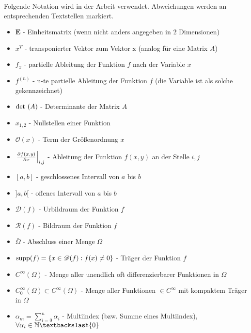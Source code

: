 Folgende Notation wird in der Arbeit verwendet. Abweichungen werden an entsprechenden Textstellen markiert.

\begin{itemize}[label={}]
    \item $\boldsymbol{E}$ - Einheitsmatrix (wenn nicht anders angegeben in 2 Dimensionen) \\
    \item $x^T$ - transponierter Vektor zum Vektor x (analog für eine Matrix $A$) \\
    \item $f_x$ - partielle Ableitung der Funktion $f$ nach der Variable $x$ \\
    \item $f^{(n)}$ - n-te partielle Ableitung der Funktion $f$ (die Variable ist als solche gekennzeichnet) \\
    \item $\text{det}\,\left(A\right)$ - Determinante der Matrix $A$ \\
    \item $x_{1,2}$ - Nullstellen einer Funktion \\
    \item $\mathcal{O}(x)$ - Term der Größenordnung $x$ \\
    \item $\left.\frac{\partial f(x,y)}{\partial x}\right\vert_{i,j}$ - Ableitung der Funktion $f(x,y)$ an der Stelle $i,j$ \\
    \item $[a,b]$ - geschlossenes Intervall von $a$ bis $b$ \\
    \item $]a,b[$ - offenes Intervall von $a$ bis $b$ \\
    \item $\mathscr{D}(f)$ - Urbildraum der Funktion $f$ \\
    \item $\mathscr{R}(f)$ - Bildraum der Funktion $f$ \\
    \item $\bar{\Omega}$ - Abschluss einer Menge $\Omega$ \\
    \item $\text{supp} (f)=\left\{ x\in \mathscr{D}(f) : f(x) \neq 0 \right\}$ - Träger der Funktion $f$ \\
    \item $C^{\infty}(\Omega)$ - Menge aller unendlich oft differenzierbarer Funktionen in $\Omega$ \\
    \item $C^{\infty}_{0} (\Omega)\subset C^{\infty}(\Omega)$ - Menge aller Funktionen $\in C^{\infty}$ mit kompaktem Träger in $\Omega$ \\
    \item $\alpha_{m} = \sum_{i=0}^{n}\alpha_{i}$ - Multiindex (bzw. Summe eines Multiindex), $\forall\alpha_i \in \mathbb{N} \textbackslash \{0\}$ \\
\end{itemize}